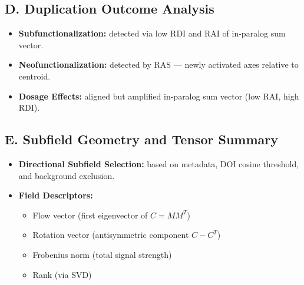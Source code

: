 \documentclass{article}
\begin{document}
\subsection*{D. Duplication Outcome Analysis}
\begin{itemize}[leftmargin=1.5em]
  \item \textbf{Subfunctionalization:} detected via low RDI and RAI of in-paralog sum vector.
  \item \textbf{Neofunctionalization:} detected by RAS — newly activated axes relative to centroid.
  \item \textbf{Dosage Effects:} aligned but amplified in-paralog sum vector (low RAI, high RDI).
\end{itemize}

\subsection*{E. Subfield Geometry and Tensor Summary}
\begin{itemize}[leftmargin=1.5em]
  \item \textbf{Directional Subfield Selection:} based on metadata, DOI cosine threshold, and background exclusion.
  \item \textbf{Field Descriptors:}
    \begin{itemize}
      \item Flow vector (first eigenvector of \( C = MM^T \))
      \item Rotation vector (antisymmetric component \( C - C^T \))
      \item Frobenius norm (total signal strength)
      \item Rank (via SVD)
    \end{itemize}
\end{itemize}
\end{document}
